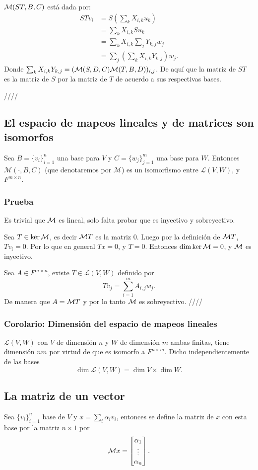 \documentclass{article}
\begin{document}
$\mathcal{M}(ST,B,C)$ está dada por: 
\begin{align*}
    STv_i &= S\left(\sum_k X_{i,k}u_k\right)\\
    &= \sum_k X_{i,k} Su_k\\
    &= \sum_k X_{i,k} \sum_j Y_{k,j} w_j \\
    &= \sum_j \left(\sum_k X_{i,k} Y_{k,j}\right) w_j.
\end{align*}
Donde $\sum_k X_{i,k} Y_{k,j} = (\mathcal{M}(S,D,C)\mathcal{M}(T,B,D))_{i,j}$.
De aquí que la matriz de $ST$ es la matriz de $S$ por la matriz
de $T$ de acuerdo a sus respectivas bases.

\hfill ////

\subsection{El espacio de mapeos lineales y de matrices son isomorfos}
Sea $B=\{v_i\}_{i=1}^n$ una base para $V$ y $C=\{w_j\}_{j=1}^m$ una base
para $W$. Entonces $\mathcal{M}(\cdot, B, C)$ (que denotaremos por 
$\mathcal{M}$) es un isomorfismo
entre $\mathcal{L}(V,W)$, y $F^{m\times n}$.
\subsubsection*{Prueba}
Es trivial que $\mathcal{M}$ es lineal, solo falta probar que es inyectivo y 
sobreyectivo.

Sea $T\in\ker\mathcal{M}$, es decir $\mathcal{M} T$ es la matriz $0$. Luego por la
definición de $\mathcal{M} T$, $Tv_i = 0$. Por lo que en general $Tx=0$,
y $T=0$. Entonces $\dim\ker\mathcal{M} = 0$, y $\mathcal{M}$ es inyectivo.

Sea $A\in F^{m\times n}$, existe $T\in\mathcal{L}(V,W)$ definido
por $$Tv_j = \sum^m_{i=1}A_{i,j} w_j.$$
De manera que $A=\mathcal{M} T$ y por lo tanto $\mathcal{M}$ es sobreyectivo.
\hfill ////

\subsubsection{Corolario: Dimensión del espacio de mapeos lineales}
$\mathcal{L}(V,W)$ con $V$ de dimensión $n$ y $W$ de dimensión $m$
ambas finitas, tiene dimensión $nm$ por virtud de que es isomorfo a
$F^{n\times m}$. Dicho independientemente de las bases
$$\dim \mathcal{L}(V,W) = \dim V \times \dim W.$$

\subsection{La matriz de un vector}
Sea $\{v_i\}_{i=1}^n$ base de $V$ y $x=\sum_i\alpha_i v_i$, 
entonces se define la matriz de $x$ con esta base por la matriz
$n\times 1$ por
$$\mathcal{M} x = \begin{bmatrix}
    \alpha_1 \\
    \vdots \\
    \alpha_n
\end{bmatrix}.$$
\end{document}
